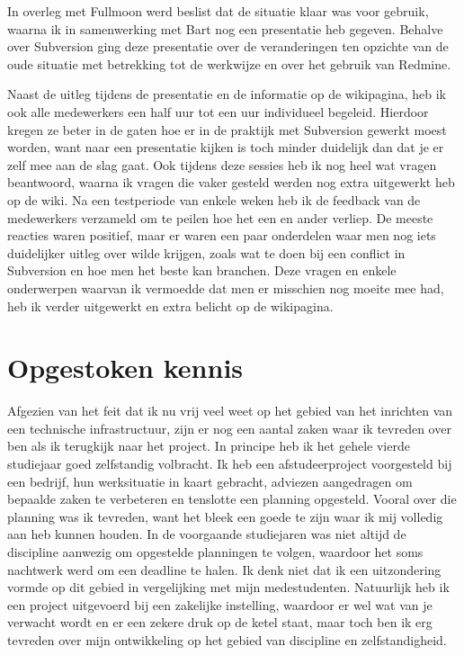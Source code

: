 In overleg met Fullmoon werd beslist dat de situatie klaar was voor gebruik, waarna ik in samenwerking met Bart nog een presentatie heb gegeven. Behalve over Subversion ging deze presentatie over de veranderingen ten opzichte van de oude situatie met betrekking tot de werkwijze en over het gebruik van Redmine.

Naast de uitleg tijdens de presentatie en de informatie op de wikipagina, heb ik ook alle medewerkers een half uur tot een uur individueel begeleid. Hierdoor kregen ze beter in de gaten hoe er in de praktijk met Subversion gewerkt moest worden, want naar een presentatie kijken is toch minder duidelijk dan dat je er zelf mee aan de slag gaat. Ook tijdens deze sessies heb ik nog heel wat vragen beantwoord, waarna ik vragen die vaker gesteld werden nog extra uitgewerkt heb op de wiki. Na een testperiode van enkele weken heb ik de feedback van de medewerkers verzameld om te peilen hoe het een en ander verliep. De meeste reacties waren positief, maar er waren een paar onderdelen waar men nog iets duidelijker uitleg over wilde krijgen, zoals wat te doen bij een conflict in Subversion en hoe men het beste kan branchen. Deze vragen en enkele onderwerpen waarvan ik vermoedde dat men er misschien nog moeite mee had, heb ik verder uitgewerkt en extra belicht op de wikipagina.

\section{Opgestoken kennis}

Afgezien van het feit dat ik nu vrij veel weet op het gebied van het inrichten van een technische infrastructuur, zijn er nog een aantal zaken waar ik tevreden over ben als ik terugkijk naar het project. In principe heb ik het gehele vierde studiejaar goed zelfstandig volbracht. Ik heb een afstudeerproject voorgesteld bij een bedrijf, hun werksituatie in kaart gebracht, adviezen aangedragen om bepaalde zaken te verbeteren en tenslotte een planning opgesteld. Vooral over die planning was ik tevreden, want het bleek een goede te zijn waar ik mij volledig aan heb kunnen houden. In de voorgaande studiejaren was niet altijd de discipline aanwezig om opgestelde planningen te volgen, waardoor het soms nachtwerk werd om een deadline te halen. Ik denk niet dat ik een uitzondering vormde op dit gebied in vergelijking met mijn medestudenten. Natuurlijk heb ik een project uitgevoerd bij een zakelijke instelling, waardoor er wel wat van je verwacht wordt en er een zekere druk op de ketel staat, maar toch ben ik erg tevreden over mijn ontwikkeling op het gebied van discipline en zelfstandigheid.

